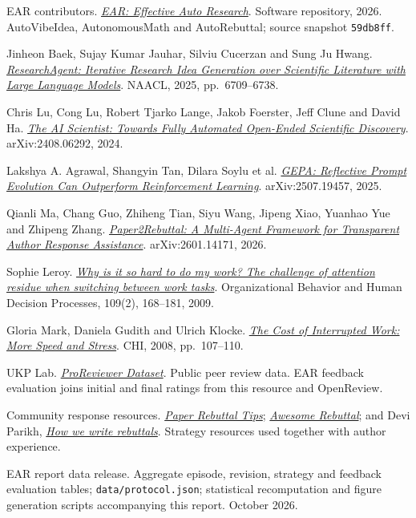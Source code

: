 \begin{enumerate}[label=\textcolor{teal}{[\arabic*]},leftmargin=9mm,itemsep=6pt,font=\sffamily\small]
\item EAR contributors. \href{https://github.com/liyingze07-svg/EffectiveAutoResearch-EAR-}{\emph{EAR: Effective Auto Research}}. Software repository, 2026. AutoVibeIdea, AutonomousMath and AutoRebuttal; source snapshot \texttt{59db8ff}.
\item Jinheon Baek, Sujay Kumar Jauhar, Silviu Cucerzan and Sung Ju Hwang. \href{https://aclanthology.org/2025.naacl-long.342/}{\emph{ResearchAgent: Iterative Research Idea Generation over Scientific Literature with Large Language Models}}. NAACL, 2025, pp.\ 6709--6738.
\item Chris Lu, Cong Lu, Robert Tjarko Lange, Jakob Foerster, Jeff Clune and David Ha. \href{https://arxiv.org/abs/2408.06292}{\emph{The AI Scientist: Towards Fully Automated Open-Ended Scientific Discovery}}. arXiv:2408.06292, 2024.
\item Lakshya A. Agrawal, Shangyin Tan, Dilara Soylu et al. \href{https://arxiv.org/abs/2507.19457}{\emph{GEPA: Reflective Prompt Evolution Can Outperform Reinforcement Learning}}. arXiv:2507.19457, 2025.
\item Qianli Ma, Chang Guo, Zhiheng Tian, Siyu Wang, Jipeng Xiao, Yuanhao Yue and Zhipeng Zhang. \href{https://arxiv.org/abs/2601.14171}{\emph{Paper2Rebuttal: A Multi-Agent Framework for Transparent Author Response Assistance}}. arXiv:2601.14171, 2026.
\item Sophie Leroy. \href{https://doi.org/10.1016/j.obhdp.2009.04.002}{\emph{Why is it so hard to do my work? The challenge of attention residue when switching between work tasks}}. Organizational Behavior and Human Decision Processes, 109(2), 168--181, 2009.
\item Gloria Mark, Daniela Gudith and Ulrich Klocke. \href{https://www.ics.uci.edu/~gmark/chi08-mark.pdf}{\emph{The Cost of Interrupted Work: More Speed and Stress}}. CHI, 2008, pp.\ 107--110.
\item UKP Lab. \href{https://huggingface.co/datasets/UKPLab/ProReviewer-Dataset}{\emph{ProReviewer Dataset}}. Public peer review data. EAR feedback evaluation joins initial and final ratings from this resource and OpenReview.
\item Community response resources. \href{https://github.com/MLNLP-World/Paper-Rebuttal-Tips}{\emph{Paper Rebuttal Tips}}; \href{https://github.com/xiongqi123123/awesome-rebuttal}{\emph{Awesome Rebuttal}}; and Devi Parikh, \href{https://deviparikh.substack.com/p/how-we-write-rebuttals-dc84742fece1}{\emph{How we write rebuttals}}. Strategy resources used together with author experience.
\item EAR report data release. Aggregate episode, revision, strategy and feedback evaluation tables; \texttt{data/protocol.json}; statistical recomputation and figure generation scripts accompanying this report. October 2026.
\end{enumerate}
